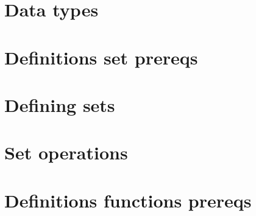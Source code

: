 
\section*{Data types}

\vfill
\section*{Definitions set prereqs}

\vfill
\section*{Defining sets}

\vfill
\section*{Set operations}

\vfill
\section*{Definitions functions prereqs}

\vfill
